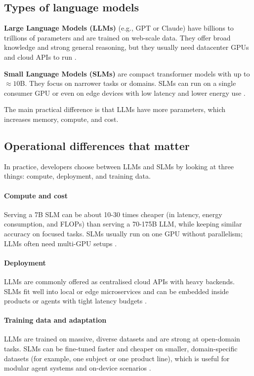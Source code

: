 \subsection{Types of language models}

\textbf{Large Language Models (LLMs)} (e.g., GPT or Claude) have billions to trillions of parameters and are trained on web-scale data. They offer broad knowledge and strong general reasoning, but they usually need datacenter GPUs and cloud APIs to run \parencite{LLMVsSLM66:online}.

\textbf{Small Language Models (SLMs)} are compact transformer models with up to \(\approx 10\)B. They focus on narrower tasks or domains. SLMs can run on a single consumer GPU or even on edge devices with low latency and lower energy use \parencite{SmallLan73:online,LLMVsSLM66:online}.

The main practical difference is that LLMs have more parameters, which increases memory, compute, and cost.

\subsection{Operational differences that matter}

In practice, developers choose between LLMs and SLMs by looking at three things: compute, deployment, and training data.

\paragraph{Compute and cost}
Serving a 7B SLM can be about 10-30 times cheaper (in latency, energy consumption, and FLOPs) than serving a 70-175B LLM, while keeping similar accuracy on focused tasks. SLMs usually run on one GPU without parallelism; LLMs often need multi-GPU setups \parencite{SmallLan73:online}.

\paragraph{Deployment}
LLMs are commonly offered as centralised cloud APIs with heavy backends. SLMs fit well into local or edge microservices and can be embedded inside products or agents with tight latency budgets \parencite{LLMVsSLM66:online,SmallLan73:online}.

\paragraph{Training data and adaptation}
LLMs are trained on massive, diverse datasets and are strong at open-domain tasks.
SLMs can be fine-tuned faster and cheaper on smaller, domain-specific datasets (for example, one subject or one product line), which is useful for modular agent systems and on-device scenarios \parencite{LLMVsSLM66:online,SmallLan73:online}.

